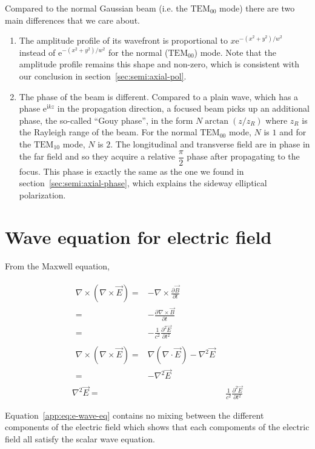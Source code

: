 \documentclass[10pt,fleqn]{article}
\newcommand{\ue}{\mathrm{e}}
\newcommand{\ui}{\mathrm{i}}
\newcommand{\eqar}[1]
{
  \begin{align}
    #1
  \end{align}
}
\newcommand{\paren}[1]{{\left({#1}\right)}}
\newcommand{\pdiff}[3][{}]{{\frac{\partial^{#1} {#2}}{\partial {#3}{}^{#1}}}}
\begin{document}
Compared to the normal Gaussian beam (i.e. the $\mathrm{TEM}_{00}$ mode)
there are two main differences that we care about.
\begin{enumerate}
\item The amplitude profile of its wavefront is proportional to
  $x\ue^{-(x^2+y^2)/w^2}$ instead of $\ue^{-(x^2+y^2)/w^2}$
  for the normal ($\mathrm{TEM}_{00}$) mode.
  Note that the amplitude profile remains this shape and non-zero,
  which is consistent with our conclusion in section~\ref{sec:semi:axial-pol}.
\item The phase of the beam is different. Compared to a plain wave,
  which has a phase $\ue^{\ui kz}$ in the propagation direction,
  a focused beam picks up an additional phase, the so-called ``Gouy phase'',
  in the form $N\arctan\paren{z/z_R}$ where $z_R$ is the Rayleigh range of the beam.
  For the normal $\mathrm{TEM}_{00}$ mode, $N$ is $1$
  and for the $\mathrm{TEM}_{10}$ mode, $N$ is $2$.
  The longitudinal and transverse field are in phase in the far field
  and so they acquire a relative $\dfrac{\pi}{2}$ phase after propagating to the focus.
  This phase is exactly the same as the one we found in
  section~\ref{sec:semi:axial-phase},
  which explains the sideway elliptical polarization.
\end{enumerate}

\clearpage
\appendix
\section{Wave equation for electric field}
\label{app:wave-eq}
From the Maxwell equation,
\eqar{
  \begin{split}
    \nabla\times\paren{\nabla\times\vec E}=&-\nabla\times\pdiff{\vec B}{t}\\
    =&-\pdiff{\nabla\times\vec B}{t}\\
    =&-\frac{1}{c^2}\pdiff[2]{\vec E}{t}
  \end{split}\\
  \begin{split}
    \nabla\times\paren{\nabla\times\vec E}
    =&\nabla\paren{\nabla\cdot\vec E}-\nabla^2\vec E\\
    =&-\nabla^2\vec E
  \end{split}\\
  \nabla^2\vec E=&\frac{1}{c^2}\pdiff[2]{\vec E}{t}\label{app:eq:e-wave-eq}
}
Equation~\ref{app:eq:e-wave-eq} contains no mixing between the different components
of the electric field which shows that each compoments of the electric field
all satisfy the scalar wave equation.\\
\end{document}
